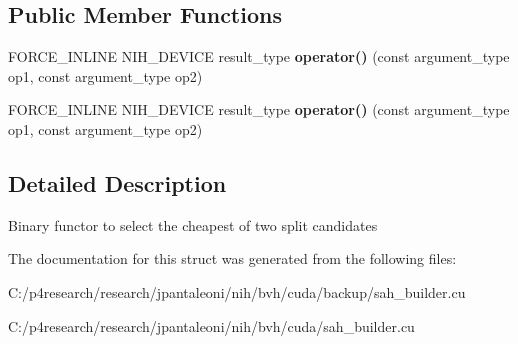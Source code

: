 \subsection*{\-Public \-Member \-Functions}
\begin{DoxyCompactItemize}
\item 
\hypertarget{structnih_1_1cuda_1_1sah_1_1_best__split__functor_a18b4c0870a24d8589c8164557e7a08d5}{
\-F\-O\-R\-C\-E\-\_\-\-I\-N\-L\-I\-N\-E \-N\-I\-H\-\_\-\-D\-E\-V\-I\-C\-E result\-\_\-type {\bfseries operator()} (const argument\-\_\-type op1, const argument\-\_\-type op2)}
\label{structnih_1_1cuda_1_1sah_1_1_best__split__functor_a18b4c0870a24d8589c8164557e7a08d5}

\item 
\hypertarget{structnih_1_1cuda_1_1sah_1_1_best__split__functor_a18b4c0870a24d8589c8164557e7a08d5}{
\-F\-O\-R\-C\-E\-\_\-\-I\-N\-L\-I\-N\-E \-N\-I\-H\-\_\-\-D\-E\-V\-I\-C\-E result\-\_\-type {\bfseries operator()} (const argument\-\_\-type op1, const argument\-\_\-type op2)}
\label{structnih_1_1cuda_1_1sah_1_1_best__split__functor_a18b4c0870a24d8589c8164557e7a08d5}

\end{DoxyCompactItemize}


\subsection{\-Detailed \-Description}
\-Binary functor to select the cheapest of two split candidates 

\-The documentation for this struct was generated from the following files\-:\begin{DoxyCompactItemize}
\item 
\-C\-:/p4research/research/jpantaleoni/nih/bvh/cuda/backup/sah\-\_\-builder.\-cu\item 
\-C\-:/p4research/research/jpantaleoni/nih/bvh/cuda/sah\-\_\-builder.\-cu\end{DoxyCompactItemize}
